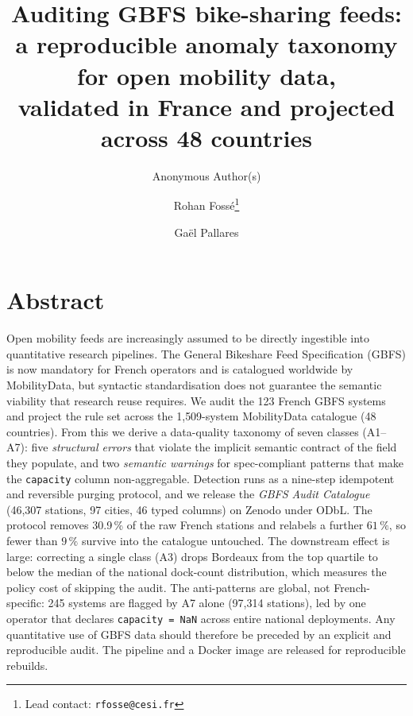 \documentclass[11pt,a4paper]{article}
\title{\bfseries\sffamily\Large Auditing GBFS bike-sharing feeds:\\
a reproducible anomaly taxonomy for open mobility data,\\
validated in France and projected across 48 countries}
\author{Anonymous Author(s)}
\author[1]{Rohan Foss\'e\thanks{Lead contact: \texttt{rfosse@cesi.fr}}}
\author[2]{Ga\"el Pallares}
\affil[1]{CESI Engineering School, Montpellier, France}
\affil[2]{CESI LINEACT (EA 7527), Montpellier, France}
\date{}
\begin{document}
\maketitle

%

\section*{Abstract}
\noindent
Open mobility feeds are increasingly assumed to be directly ingestible
into quantitative research pipelines. The General Bikeshare Feed
Specification (GBFS) is now mandatory for French operators and is
catalogued worldwide by MobilityData, but syntactic standardisation does
not guarantee the semantic viability that research reuse requires. We
audit the 123 French GBFS systems and project the rule set across the
1{,}509-system MobilityData catalogue (48 countries). From this we derive
a data-quality taxonomy of seven classes (A1--A7): five \emph{structural
errors} that violate the implicit semantic contract of the field they
populate, and two \emph{semantic warnings} for spec-compliant patterns
that make the \texttt{capacity} column non-aggregable. Detection runs as a
nine-step idempotent and reversible purging protocol, and we release the
\emph{GBFS Audit Catalogue} (46{,}307 stations, 97 cities, 46 typed
columns) on Zenodo under ODbL. The protocol removes 30.9\,\% of
the raw French stations and relabels a further $61\,\%$, so fewer than
$9\,\%$ survive into the catalogue untouched. The downstream effect is
large: correcting a single class (A3) drops Bordeaux from the top quartile
to below the median of the national dock-count distribution, which measures
the policy cost of skipping the audit. The anti-patterns are global, not French-specific:
245 systems are flagged by A7 alone (97{,}314 stations), led by one
operator that declares \texttt{capacity = NaN} across entire national
deployments. Any quantitative use of GBFS data should therefore be
preceded by an explicit and reproducible audit. The pipeline and a Docker
image are released for reproducible rebuilds.
\end{document}
